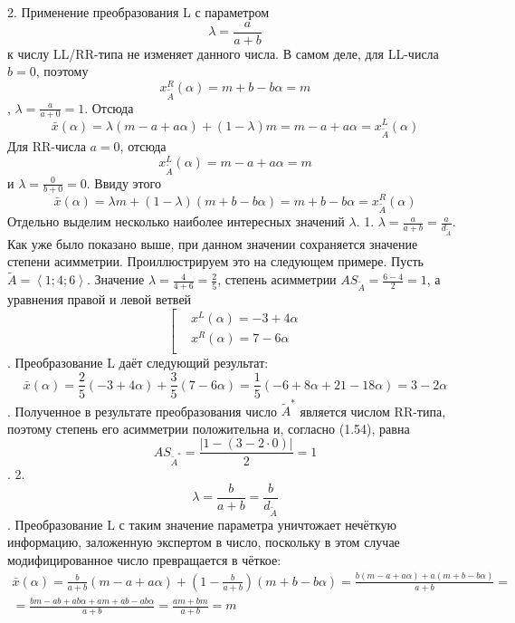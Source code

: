 2. Применение преобразования L с параметром \[\lambda =\frac{a}{a+b}\] к числу LL/RR-типа не изменяет данного числа.
В самом деле, для LL-числа $b=0$, поэтому \[x_{{\tilde{A}}}^{R}\left( \alpha  \right)=m+b-b\alpha =m\], $\lambda =\frac{a}{a+0}=1$. Отсюда
	\[\bar{x}\left( \alpha  \right)=\lambda \left( m-a+a\alpha  \right)+\left( 1-\lambda  \right)m=m-a+a\alpha =x_{{\tilde{A}}}^{L}\left( \alpha  \right)\] 
Для RR-числа $a=0$, отсюда \[x_{{\tilde{A}}}^{L}\left( \alpha  \right)=m-a+a\alpha =m\] и $\lambda =\frac{0}{b+0}=0$. Ввиду этого
	\[\bar{x}\left( \alpha  \right)=\lambda m+\left( 1-\lambda  \right)\left( m+b-b\alpha  \right)=m+b-b\alpha =x_{{\tilde{A}}}^{R}\left( \alpha  \right)\] 
Отдельно выделим несколько наиболее интересных значений $\lambda $.
1. $\lambda =\frac{a}{a+b}=\frac{a}{{{d}_{{\tilde{A}}}}}$. Как уже было показано выше, при данном значении сохраняется значение степени асимметрии.
Проиллюстрируем это на следующем примере. Пусть $\tilde{A}=\left\langle 1;4;6 \right\rangle $. Значение $\lambda =\frac{4}{4+6}=\frac{2}{5}$, степень асимметрии $A{{S}_{{\tilde{A}}}}=\frac{6-4}{2}=1$, а уравнения правой и левой ветвей
	\[\left[ \begin{aligned}
  & {{x}^{L}}\left( \alpha  \right)=-3+4\alpha  \\ 
 & {{x}^{R}}\left( \alpha  \right)=7-6\alpha  \\ 
\end{aligned} \right.\].
Преобразование L даёт следующий результат:
	\[\bar{x}\left( \alpha  \right)=\frac{2}{5}\left( -3+4\alpha  \right)+\frac{3}{5}\left( 7-6\alpha  \right)=\frac{1}{5}\left( -6+8\alpha +21-18\alpha  \right)=3-2\alpha \].
Полученное в результате преобразования число ${{\tilde{A}}^{*}}$ является числом RR-типа, поэтому степень его асимметрии положительна и, согласно (1.54), равна
	\[A{{S}_{{{{\tilde{A}}}^{*}}}}=\frac{\left| 1-\left( 3-2\cdot 0 \right) \right|}{2}=1\].
2. \[\lambda =\frac{b}{a+b}=\frac{b}{{{d}_{{\tilde{A}}}}}\]. Преобразование L с таким значение параметра уничтожает нечёткую информацию, заложенную экспертом в число, поскольку в этом случае модифицированное число превращается в чёткое:
	\[\begin{matrix}
  \bar{x}\left( \alpha  \right)=\frac{b}{a+b}\left( m-a+a\alpha  \right)+\left( 1-\frac{b}{a+b} \right)\left( m+b-b\alpha  \right)=\frac{b\left( m-a+a\alpha  \right)+a\left( m+b-b\alpha  \right)}{a+b}= \\ 
  =\frac{bm-ab+ab\alpha +am+ab-ab\alpha }{a+b}=\frac{am+bm}{a+b}=m \\ 
\end{matrix}\] 
